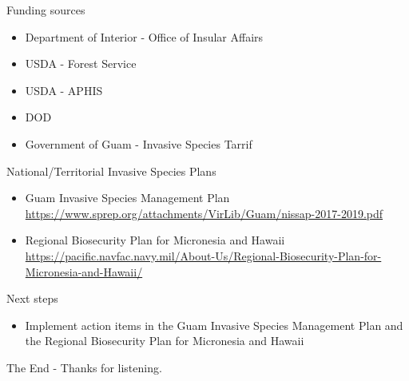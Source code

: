 \documentclass[]{beamer}
\begin{document}
\begin{frame}{Funding sources}
	\begin{itemize}
	   \item Department of Interior - Office of Insular Affairs
	   \item USDA - Forest Service
	   \item USDA - APHIS
	   \item DOD
	   \item Government of Guam - Invasive Species Tarrif
	\end{itemize}		
\end{frame}

\begin{frame}{National/Territorial Invasive Species Plans}
	\begin{itemize}
		\item Guam Invasive Species Management Plan \url{https://www.sprep.org/attachments/VirLib/Guam/nissap-2017-2019.pdf}
		\item Regional Biosecurity Plan for Micronesia and Hawaii
		\url{https://pacific.navfac.navy.mil/About-Us/Regional-Biosecurity-Plan-for-Micronesia-and-Hawaii/}
	\end{itemize}	
\end{frame}

\begin{frame}{Next steps}
	\begin{itemize}
		\item Implement action items in the Guam Invasive Species Management Plan and the Regional Biosecurity Plan for Micronesia and Hawaii
	\end{itemize}
\end{frame}

\begin{frame}{The End - Thanks for listening.}
\end{frame}
\end{document}
